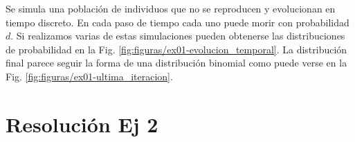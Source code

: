 \documentclass[twocolumn,aps,prl]{revtex4-1}
\begin{document}
Se simula una población de individuos que no se reproducen y evolucionan en tiempo discreto. En cada paso de tiempo cada uno puede morir con probabilidad $d$. Si realizamos varias de estas simulaciones pueden obtenerse las distribuciones de probabilidad en la Fig. \ref{fig:figuras/ex01-evolucion_temporal}. La distribución final parece seguir la forma de una distribución binomial como puede verse en la Fig. \ref{fig:figuras/ex01-ultima_iteracion}.

\section{Resolución Ej 2}
\end{document}
